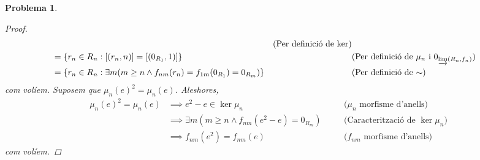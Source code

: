 \documentclass[compress]{article}
\newtheorem{problema}{Problema}
\theoremstyle{definition}
\begin{document}
\begin{problema}
\begin{enumerate}
\begin{proof}
\begin{align*}
                &\quad&\textrm{(Per definició de $\ker$)}\\
                &=\{r_{n}\in R_{n}:[(r_{n},n)]=[(0_{R_{1}},1)]\}
                &\quad&\textrm{(Per definició de $\mu_{n}$ i $0_{\varinjlim(R_{n},f_{n})}$)}\\
                &=\{r_{n}\in R_{n}:\exists m(m\geq n\land f_{nm}(r_{n})=f_{1m}(0_{R_{1}})=0_{R_{m}})\}
                &\quad&\textrm{(Per definició de $\sim$)}
            \end{align*}
            com volíem.\newline
            Suposem que $\mu_{n}(e)^{2}=\mu_{n}(e)$. Aleshores,
            \begin{align*}
                \mu_{n}(e)^{2}=\mu_{n}(e)
                &\implies e^{2}-e\in\ker{\mu_{n}}
                &\quad&\textrm{($\mu_{n}$ morfisme d'anells)}\\
                &\implies\exists m(m\geq n\land f_{nm}(e^{2}-e)=0_{R_{m}})
                &\quad&\textrm{(Caracterització de $\ker{\mu_{n}}$)}\\
                &\implies f_{nm}(e^{2})=f_{nm}(e)
                &\quad&\textrm{($f_{nm}$ morfisme d'anells)}
            \end{align*}
            com volíem.
        \end{proof}
     \end{enumerate}
\end{problema}
\end{document}

